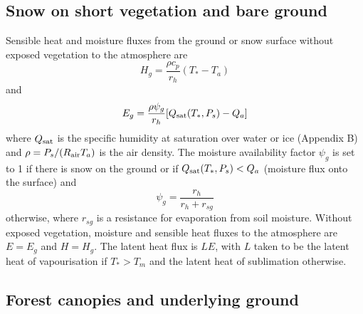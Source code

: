 \documentclass{article}
\begin{document}
\subsection{Snow on short vegetation and bare ground}

Sensible heat and moisture fluxes from the ground or snow surface without exposed vegetation to the atmosphere are
\begin{equation}
H_g = \frac{\rho c_p}{r_h}(T_* - T_a)
\end{equation}
and
\begin{equation}
E_g = \frac{\rho\psi_g}{r_h}[Q_{\rm sat}(T_*,P_s) - Q_a]
\label{eq:E}
\end{equation}
where $Q_{\rm sat}$ is the specific humidity at saturation over water or ice (Appendix B) and $\rho=P_s/(R_{\rm air}T_a)$ is the air density. The moisture availability factor $\psi_g$ is set to 1 if there is snow on the ground or if $Q_{\rm sat}(T_*,P_s)<Q_a$ (moisture flux onto the surface) and 
\begin{equation}
\psi_g = \frac{r_h}{r_h+r_{sg}}
\label{eq:psig}
\end{equation}
otherwise, where $r_{sg}$ is a resistance for evaporation from soil moisture. Without exposed vegetation, moisture and sensible heat fluxes to the atmosphere are $E=E_g$ and $H=H_g$. The latent heat flux is $LE$, with $L$ taken to be the latent heat of vapourisation if $T_*>T_m$ and the latent heat of sublimation otherwise.

\subsection{Forest canopies and underlying ground}
\end{document}
